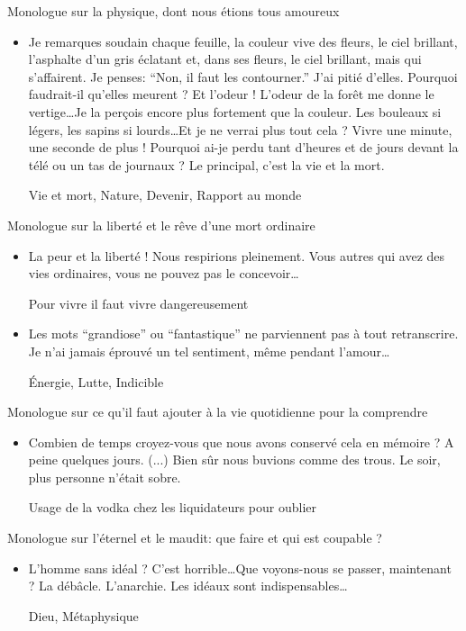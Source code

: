 \documentclass[french,a4paper,11pt,answers]{exam}
\newcommand{\cit}[2]{\og #1 \fg{} \begin{solution}{ #2 }\end{solution}} %
\begin{document}
	\begin{cadre}{Monologue sur la physique{,} dont nous étions tous amoureux}
		\begin{itemize}
			\item \cit{Je remarques soudain chaque feuille, la couleur vive des fleurs, le ciel brillant, l'asphalte d'un gris éclatant et, dans ses fleurs, le ciel brillant, mais qui s'affairent. Je penses: “Non, il faut les contourner.'' J'ai pitié d'elles. Pourquoi faudrait-il qu'elles meurent ? Et l'odeur ! L'odeur de la forêt me donne le vertige\ldots Je la perçois encore plus fortement que la couleur. Les bouleaux si légers, les sapins si lourds\ldots Et je ne verrai plus tout cela ? Vivre une minute, une seconde de plus ! Pourquoi ai-je perdu tant d'heures et de jours devant la télé ou un tas de journaux ? Le principal, c'est la vie et la mort.}
				{Vie et mort, Nature, Devenir, Rapport au monde}
		\end{itemize}
	\end{cadre}
	
	\begin{cadre}{Monologue sur la liberté et le rêve d'une mort ordinaire}
		\begin{itemize}
			\item \cit{La peur et la liberté ! Nous respirions pleinement. Vous autres qui avez des vies ordinaires, vous ne pouvez pas le concevoir\ldots}
				{Pour vivre il faut vivre dangereusement}
			\item \cit{Les mots “grandiose'' ou “fantastique'' ne parviennent pas à tout retranscrire. Je n'ai jamais éprouvé un tel sentiment, même pendant l'amour\ldots}
				{Énergie, Lutte, Indicible}
		\end{itemize}
	\end{cadre}

	\begin{cadre}{Monologue sur ce qu'il faut ajouter à la vie quotidienne pour la comprendre}
		\begin{itemize}
			\item \cit {Combien de temps croyez-vous que nous avons conservé cela en mémoire ? A peine quelques jours. (...) Bien sûr nous buvions comme des trous. Le soir, plus personne n'était sobre.}
			{Usage de la vodka chez les liquidateurs pour oublier}
		\end{itemize}
	\end{cadre}
	
	\begin{cadre}{Monologue sur l'éternel et le maudit: que faire et qui est coupable ?}
		\begin{itemize}
			\item \cit{L'homme sans idéal ? C'est horrible\ldots Que voyons-nous se passer, maintenant ? La débâcle. L'anarchie. Les idéaux sont indispensables\ldots}
				{Dieu, Métaphysique}
		\end{itemize}
	\end{cadre}
	
\end{document}
